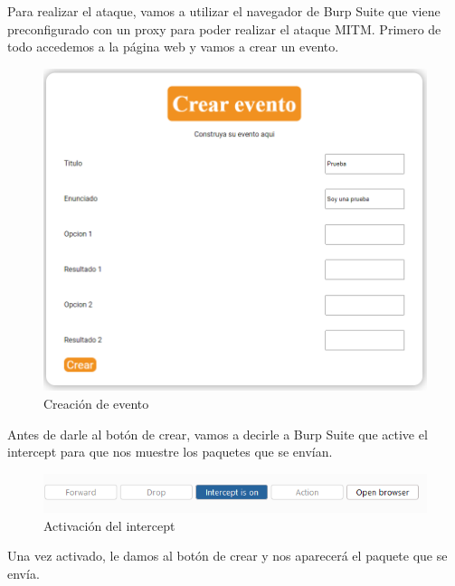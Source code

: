 \documentclass{report}
\begin{document}
                Para realizar el ataque, vamos a utilizar el navegador de Burp Suite que viene preconfigurado con un proxy para poder realizar el ataque MITM.
                Primero de todo accedemos a la página web y vamos a crear un evento.
                \begin{figure}[H]
                    \centering
                    \includegraphics[width=1\textwidth]{./img/vulnerabilidades/2.2/2.1.png}
                    \caption{Creación de evento}
                \end{figure}
                \clearpage
                Antes de darle al botón de crear, vamos a decirle a Burp Suite que active el intercept para que nos muestre los paquetes que se envían.
                \begin{figure}[H]
                    \centering
                    \includegraphics[width=1\textwidth]{./img/vulnerabilidades/2.2/2.2.png}
                    \caption{Activación del intercept}
                \end{figure}
                Una vez activado, le damos al botón de crear y nos aparecerá el paquete que se envía.
\end{document}
